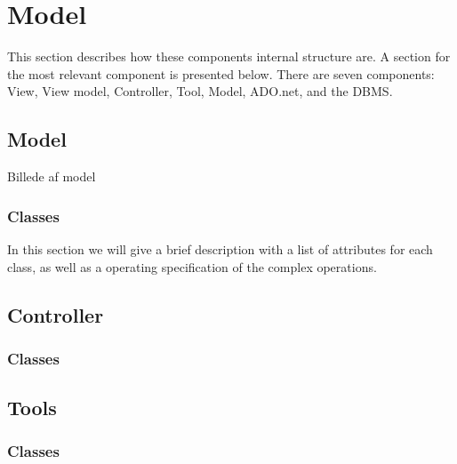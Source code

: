 \section{Model}

This section describes how these components internal structure are.
A section for the most relevant component is presented below.
There are seven components: View, View model, Controller, Tool, Model, ADO.net, and the DBMS. 



\subsection{Model}

Billede af model


\subsubsection{Classes}
In this section we will give a brief description with a list of attributes for each class, as well as a operating specification of the complex operations.



\subsection{Controller}

\subsubsection{Classes}




\subsection{Tools}

\subsubsection{Classes}